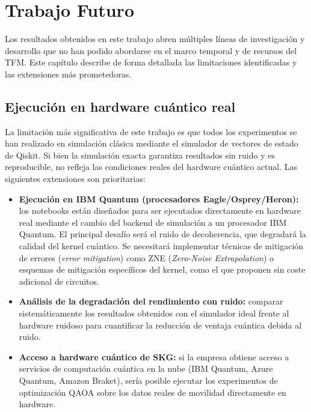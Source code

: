 \chapter{Trabajo Futuro}
\label{cap:futuro}

Los resultados obtenidos en este trabajo abren múltiples líneas de investigación y desarrollo que no han podido abordarse en el marco temporal y de recursos del TFM. Este capítulo describe de forma detallada las limitaciones identificadas y las extensiones más prometedoras.

\section{Ejecución en hardware cuántico real}

La limitación más significativa de este trabajo es que todos los experimentos se han realizado en simulación clásica mediante el simulador de vectores de estado de Qiskit. Si bien la simulación exacta garantiza resultados sin ruido y es reproducible, no refleja las condiciones reales del hardware cuántico actual. Las siguientes extensiones son prioritarias:

\begin{itemize}
    \item \textbf{Ejecución en IBM Quantum (procesadores Eagle/Osprey/Heron):} los notebooks están diseñados para ser ejecutados directamente en hardware real mediante el cambio del backend de simulación a un procesador IBM Quantum. El principal desafío será el ruido de decoherencia, que degradará la calidad del kernel cuántico. Se necesitará implementar técnicas de mitigación de errores (\textit{error mitigation}) como ZNE (\textit{Zero-Noise Extrapolation}) o esquemas de mitigación específicos del kernel, como el que proponen \citet{haug2023} sin coste adicional de circuitos.
    \item \textbf{Análisis de la degradación del rendimiento con ruido:} comparar sistemáticamente los resultados obtenidos con el simulador ideal frente al hardware ruidoso para cuantificar la reducción de ventaja cuántica debida al ruido.
    \item \textbf{Acceso a hardware cuántico de SKG:} si la empresa obtiene acceso a servicios de computación cuántica en la nube (IBM Quantum, Azure Quantum, Amazon Braket), sería posible ejecutar los experimentos de optimización QAOA sobre los datos reales de movilidad directamente en hardware.
\end{itemize}

